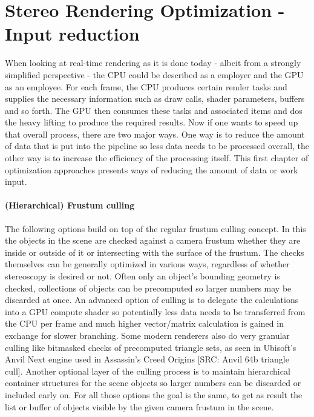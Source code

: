 
\chapter{Stereo Rendering Optimization - Input reduction}
When looking at real-time rendering as it is done today - albeit from a strongly simplified perspective - the CPU could be described as a employer and the GPU as an employee. For each frame, the CPU produces certain render tasks and supplies the necessary information such as draw calls, shader parameters, buffers and so forth. The GPU then consumes these tasks and associated items and dos the heavy lifting to produce the required results. 
Now if one wants to speed up that overall process, there are two major ways. One way is to reduce the amount of data that is put into the pipeline so less data needs to be processed overall, the other way is to increase the efficiency of the processing itself.  
This first chapter of optimization approaches presents ways of reducing the amount of data or work input. 

\subsubsection{(Hierarchical) Frustum culling}
The following options build on top of the regular frustum culling concept. In this the objects in the scene are checked against a camera frustum whether they are inside or outside of it or intersecting with the surface of the frustum. The checks themselves can be generally optimized in various ways, regardless of whether stereoscopy is desired or not. Often only an object's bounding geometry is checked, collections of objects can be precomputed so larger numbers may be discarded at once. An advanced option of culling is to delegate the calculations into a GPU compute shader so potentially less data needs to be transferred from the CPU per frame and much higher vector/matrix calculation is gained in exchange for slower branching. Some modern renderers also do very granular culling like bitmasked checks of precomputed triangle sets, as seen in Ubisoft's Anvil Next engine used in Assassin's Creed Origins [SRC: Anvil 64b triangle cull]. 
Another optional layer of the culling process is to maintain hierarchical container structures for the scene objects so larger numbers can be discarded or included early on. 
For all those options the goal is the same, to get as result the list or buffer of objects visible by the given camera frustum in the scene. 

